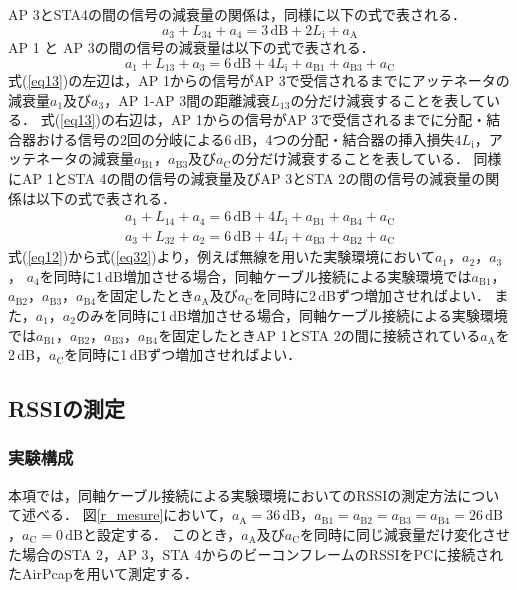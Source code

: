 \documentclass[master]{kuisthesis}		%
\begin{document}
AP 3とSTA4の間の信号の減衰量の関係は，同様に以下の式で表される．
\begin{equation}
a_3 + L_{34} +a_4 = 3\,\mathrm{dB} +2L_{\mathrm{i}} + a_\mathrm{A}
\label{eq34}
\end{equation}
AP 1 と AP 3の間の信号の減衰量は以下の式で表される．
\begin{equation}
a_1 + L_{13} +a_3 = 6\,\mathrm{dB} +4L_{\mathrm{i}} + a_\mathrm{B1} + a_\mathrm{B3} + a_\mathrm{C}
\label{eq13}
\end{equation}
式(\ref{eq13})の左辺は，AP 1からの信号がAP 3で受信されるまでにアッテネータの減衰量$a_1$及び$a_3$，AP 1-AP 3間の距離減衰$L_{13}$の分だけ減衰することを表している．
式(\ref{eq13})の右辺は，AP 1からの信号がAP 3で受信されるまでに分配・結合器おける信号の2回の分岐による6\,dB，4つの分配・結合器の挿入損失$4L_{\mathrm{i}}$，アッテネータの減衰量$a_\mathrm{B1}$，$a_\mathrm{B3}$及び$a_\mathrm{C}$の分だけ減衰することを表している．
同様にAP 1とSTA 4の間の信号の減衰量及びAP 3とSTA 2の間の信号の減衰量の関係は以下の式で表される．
\begin{align}\label{eq14}
a_1 + L_{14} +a_4 = 6\,\mathrm{dB} +4L_{\mathrm{i}} + a_\mathrm{B1} + a_\mathrm{B4} + a_\mathrm{C}\\
a_3 + L_{32} +a_2 = 6\,\mathrm{dB} +4L_{\mathrm{i}} + a_\mathrm{B3} + a_\mathrm{B2} + a_\mathrm{C} 
\label{eq32}
\end{align}
式(\ref{eq12})から式(\ref{eq32})より，例えば無線を用いた実験環境において$a_1$，$a_2$，$a_3$，
$a_4$を同時に1\,dB増加させる場合，同軸ケーブル接続による実験環境では$a_\mathrm{B1}$，$a_\mathrm{B2}$，$a_\mathrm{B3}$，$a_\mathrm{B4}$を固定したとき$a_\mathrm{A}$及び$a_\mathrm{C}$を同時に2\,dBずつ増加させればよい．
また，$a_1$，$a_2$のみを同時に1\,dB増加させる場合，同軸ケーブル接続による実験環境では$a_\mathrm{B1}$，$a_\mathrm{B2}$，$a_\mathrm{B3}$，$a_\mathrm{B4}$を固定したときAP 1とSTA 2の間に接続されている$a_\mathrm{A}$を2\,dB，$a_\mathrm{C}$を同時に1\,dBずつ増加させればよい．
\subsection{RSSIの測定}\label{RSSIの測定}
\subsubsection{実験構成}\label{RSSI測定構成}
本項では，同軸ケーブル接続による実験環境においてのRSSIの測定方法について述べる．
図\ref{r_mesure}において，$a_\mathrm{A} = 36\,\mathrm{dB}$，$a_\mathrm{B1} = a_\mathrm{B2} =a_\mathrm{B3} =a_\mathrm{B4} = 26\,\mathrm{dB}$，$a_\mathrm{C} = 0\,\mathrm{dB}$と設定する．
このとき，$a_\mathrm{A}$及び$a_\mathrm{C}$を同時に同じ減衰量だけ変化させた場合のSTA 2，AP 3，STA 4からのビーコンフレームのRSSIをPCに接続されたAirPcapを用いて測定する．
\end{document}
